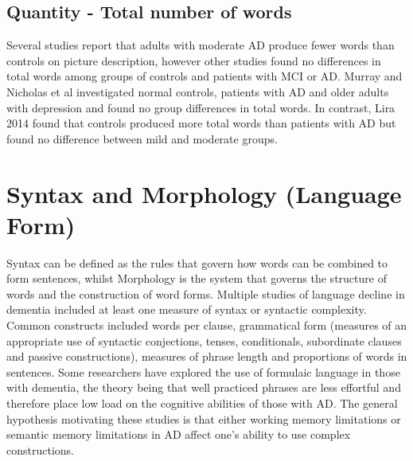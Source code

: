 \documentclass[10pt, letterpaper, twoside, openany]{book}
\begin{document}
\subsection{Quantity - Total number of words}
Several studies report that adults with moderate AD produce fewer words than controls on picture description, however other studies found no differences in total words among groups of controls and patients with MCI or AD. Murray and Nicholas et al investigated normal controls, patients with AD and older adults with depression and found no group differences in total words. In contrast, Lira 2014 found that controls produced more total words than patients with AD but found no difference between mild and moderate groups.
\par
\section{Syntax and Morphology (Language Form)}
Syntax can be defined as the rules that govern how words can be combined to form sentences, whilst Morphology is the system that governs the structure of words and the construction of word forms. Multiple studies of language decline in dementia included at least one measure of syntax or syntactic complexity. Common constructs included words per clause, grammatical form (measures of an appropriate use of syntactic conjections, tenses, conditionals, subordinate clauses and passive constructions), measures of phrase length and proportions of words in sentences. Some researchers have explored the use of formulaic language in those with dementia, the theory being that well practiced phrases are less effortful and therefore place low load on the cognitive abilities of those with AD. The general hypothesis motivating these studies is that either working memory limitations or semantic memory limitations in AD affect one's ability to use complex constructions.
\par
\end{document}

